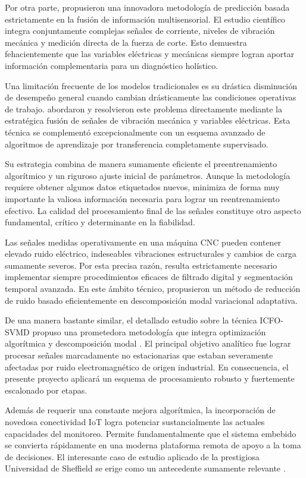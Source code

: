 Por otra parte, \cite{wang2024} propusieron una innovadora metodología de predicción basada estrictamente en la fusión de información multisensorial. El estudio científico integra conjuntamente complejas señales de corriente, niveles de vibración mecánica y medición directa de la fuerza de corte. Esto demuestra fehacientemente que las variables eléctricas y mecánicas siempre logran aportar información complementaria para un diagnóstico holístico.

Una limitación frecuente de los modelos tradicionales es su drástica disminución de desempeño general cuando cambian drásticamente las condiciones operativas de trabajo. \cite{huang2026} abordaron y resolvieron este problema directamente mediante la estratégica fusión de señales de vibración mecánica y variables eléctricas. Esta técnica se complementó excepcionalmente con un esquema avanzado de algoritmos de aprendizaje por transferencia completamente supervisado.

Su estrategia combina de manera sumamente eficiente el preentrenamiento algorítmico y un riguroso ajuste inicial de parámetros. Aunque la metodología requiere obtener algunos datos etiquetados nuevos, minimiza de forma muy importante la valiosa información necesaria para lograr un reentrenamiento efectivo. La calidad del procesamiento final de las señales constituye otro aspecto fundamental, crítico y determinante en la fiabilidad.

Las señales medidas operativamente en una máquina CNC pueden contener elevado ruido eléctrico, indeseables vibraciones estructurales y cambios de carga sumamente severos. Por esta precisa razón, resulta estrictamente necesario implementar siempre procedimientos eficaces de filtrado digital y segmentación temporal avanzada. En este ámbito técnico, \cite{jia2025} propusieron un método de reducción de ruido basado eficientemente en descomposición modal variacional adaptativa.

De una manera bastante similar, el detallado estudio sobre la técnica ICFO-SVMD propuso una prometedora metodología que integra optimización algorítmica y descomposición modal \citep{icfo2026}. El principal objetivo analítico fue lograr procesar señales marcadamente no estacionarias que estaban severamente afectadas por ruido electromagnético de origen industrial. En consecuencia, el presente proyecto aplicará un esquema de procesamiento robusto y fuertemente escalonado por etapas.

Además de requerir una constante mejora algorítmica, la incorporación de novedosa conectividad IoT logra potenciar sustancialmente las actuales capacidades del monitoreo. Permite fundamentalmente que el sistema embebido se convierta rápidamente en una moderna plataforma remota de apoyo a la toma de decisiones. El interesante caso de estudio aplicado de la prestigiosa Universidad de Sheffield se erige como un antecedente sumamente relevante \citep{sheffield2021}.

